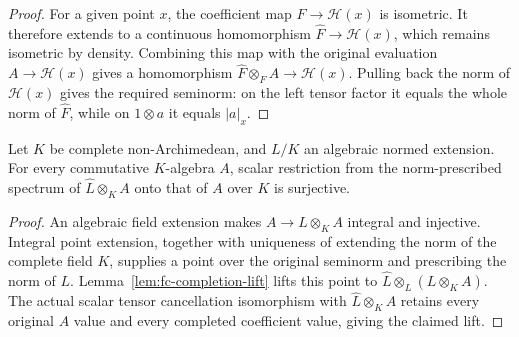 \begin{proof}
For a given point $x$, the coefficient map $F\to\mathcal H(x)$ is isometric. It therefore extends to a continuous
homomorphism $\widehat F\to\mathcal H(x)$, which remains isometric by density. Combining this map with the original
evaluation $A\to\mathcal H(x)$ gives a homomorphism $\widehat F\otimes_FA\to\mathcal H(x)$. Pulling back the norm
of $\mathcal H(x)$ gives the required seminorm: on the left tensor factor it equals the whole norm of
$\widehat F$, while on $1\otimes a$ it equals $|a|_x$.
\end{proof}

\begin{lemma}\label{lem:fc-algebraic-completion-lift}
\leanok
{}
Let $K$ be complete non-Archimedean, and $L/K$ an algebraic normed extension. For every commutative $K$-algebra $A$,
scalar restriction from the norm-prescribed spectrum of $\widehat L\otimes_KA$ onto that of $A$ over $K$ is surjective.
\end{lemma}

\begin{proof}
An algebraic field extension makes $A\to L\otimes_KA$ integral and injective. Integral point extension, together
with uniqueness of extending the norm of the complete field $K$, supplies a point over the original seminorm and
prescribing the norm of $L$. Lemma~\ref{lem:fc-completion-lift} lifts this point to
$\widehat L\otimes_L(L\otimes_KA)$. The actual scalar tensor cancellation isomorphism with
$\widehat L\otimes_KA$ retains every original $A$ value and every completed coefficient value, giving the claimed lift.
\end{proof}

